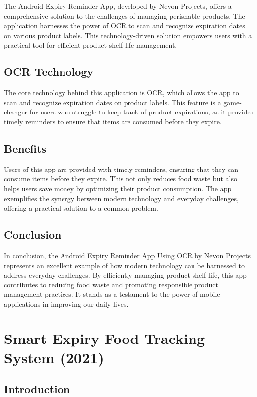 The Android Expiry Reminder App, developed by Nevon Projects, offers a comprehensive solution to the challenges of managing perishable products. The application harnesses the power of OCR to scan and recognize expiration dates on various product labels. This technology-driven solution empowers users with a practical tool for efficient product shelf life management.

\subsection{OCR Technology}

The core technology behind this application is OCR, which allows the app to scan and recognize expiration dates on product labels. This feature is a game-changer for users who struggle to keep track of product expirations, as it provides timely reminders to ensure that items are consumed before they expire.

\subsection{Benefits}

Users of this app are provided with timely reminders, ensuring that they can consume items before they expire. This not only reduces food waste but also helps users save money by optimizing their product consumption. The app exemplifies the synergy between modern technology and everyday challenges, offering a practical solution to a common problem.

\subsection{Conclusion}

In conclusion, the Android Expiry Reminder App Using OCR by Nevon Projects represents an excellent example of how modern technology can be harnessed to address everyday challenges. By efficiently managing product shelf life, this app contributes to reducing food waste and promoting responsible product management practices. It stands as a testament to the power of mobile applications in improving our daily lives.


\section{Smart Expiry Food Tracking System (2021)}

\subsection{Introduction}

